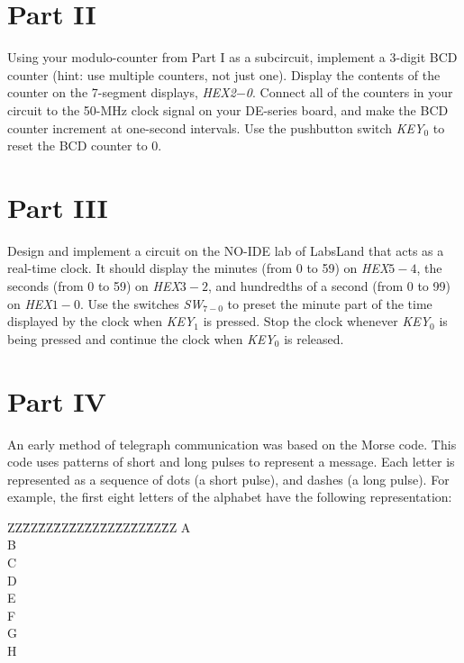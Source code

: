 \documentclass[epsfig,10pt,fullpage]{article}
\begin{document}
\section*{Part II}
Using your modulo-counter from Part I as a subcircuit, 
implement a 3-digit BCD counter (hint: use multiple counters, not just one). Display the 
contents of the counter on the 7-segment displays, {\it HEX2$-$0}. Connect all of the counters 
in your circuit to the 50-MHz clock signal on your DE-series board, and make the BCD counter
increment at one-second intervals.
Use the pushbutton switch {\it KEY}$_0$ to reset the BCD counter to 0.

\section*{Part III}
Design and implement a circuit on the NO-IDE lab of LabsLand that acts as a real-time clock.
It should display the minutes (from 0 to 59) on {\it HEX$5-4$}, the seconds (from 0 to 59)
on {\it HEX$3-2$}, and hundredths of a second (from 0 to 99) on {\it HEX}$1-0$. Use the 
switches {\it SW}$_{7-0}$ to preset the minute 
part of the time displayed by the clock when {\it KEY}$_1$ is pressed.
Stop the clock whenever {\it KEY}$_0$ is being pressed and continue the clock when 
{\it KEY}$_0$ is released.

\section*{Part IV}
An early method of telegraph communication was based on the Morse code. This code uses 
patterns of short and long pulses to represent a message. Each letter is represented as a 
sequence of dots (a short pulse), and dashes (a long pulse). For example, the first eight 
letters of the alphabet have the following representation:

\begin{table}[H]
\begin{center}
\begin{minipage}[t]{12.5 cm}
\begin{tabbing}
ZZ\=ZZ\=ZZ\=ZZ\=ZZ\=ZZ\=ZZ\=ZZ\=ZZ\=ZZ\=ZZ\kill
\>A\>\>{\bf $\bullet$  ---}\\
\>B\>\>{\bf ---  $\bullet$  $\bullet$  $\bullet$}\\
\>C\>\>{\bf ---  $\bullet$  ---  $\bullet$}\\
\>D\>\>{\bf ---  $\bullet$  $\bullet$}\\
\>E\>\>{\bf $\bullet$}\\
\>F\>\>{\bf $\bullet$  $\bullet$  ---  $\bullet$}\\
\>G\>\>{\bf ---  ---  $\bullet$}\\
\>H\>\>{\bf $\bullet$  $\bullet$  $\bullet$  $\bullet$}\\
\end{tabbing}
\end{minipage}
\end{center}
\end{table}
\end{document}
